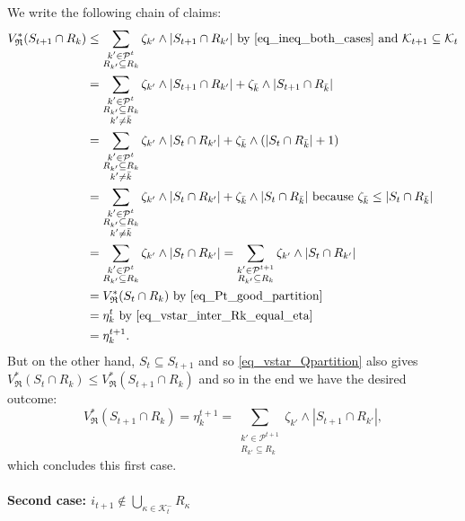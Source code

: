 \documentclass[
  11pt,
  a4paper,
]{article}
\let\oldparagraph\paragraph
\renewcommand{\paragraph}[1]{\oldparagraph{#1}\mbox{}}
\theoremstyle{plain}
\theoremstyle{definition}
\theoremstyle{plain}
\theoremstyle{definition}
\theoremstyle{plain}
\theoremstyle{remark}
\begin{document}
We write the following chain of claims: \begin{align*}
V^*_{\mathfrak{R}}(S_{t+1}\cap R_k)&\leq \sum_{\substack{k'\in\mathcal{P}^{t}\\R_{k'}\subseteq R_k}} \zeta_{k'}\wedge |S_{t+1}\cap R_{k'}|\text{ by~\eqref{eq_ineq_both_cases} and }\mathcal{K}_{t+1}\subseteq\mathcal{K}_t\\
&=\sum_{\substack{k'\in\mathcal{P}^{t}\\R_{k'}\subseteq R_k\\ k'\neq\bar k}} \zeta_{k'}\wedge |S_{t+1}\cap R_{k'}| + \zeta_{\bar k}\wedge |S_{t+1}\cap R_{\bar k}| \\
&=\sum_{\substack{k'\in\mathcal{P}^{t}\\R_{k'}\subseteq R_k\\ k'\neq\bar k}} \zeta_{k'}\wedge |S_{t}\cap R_{k'}| + \zeta_{\bar k}\wedge( |S_{t}\cap R_{\bar k}| +1)\\
&=\sum_{\substack{k'\in\mathcal{P}^{t}\\R_{k'}\subseteq R_k\\ k'\neq\bar k}} \zeta_{k'}\wedge |S_{t}\cap R_{k'}| + \zeta_{\bar k}\wedge|S_{t}\cap R_{\bar k}|\text{ because $\zeta_{\bar k}\leq |S_t\cap R_{\bar k}|$}\\
&=\sum_{\substack{k'\in\mathcal{P}^{t}\\R_{k'}\subseteq R_k}} \zeta_{k'}\wedge |S_{t}\cap R_{k'}|=\sum_{\substack{k'\in\mathcal{P}^{t+1}\\R_{k'}\subseteq R_k}} \zeta_{k'}\wedge |S_{t}\cap R_{k'}| \\
&=V^*_{\mathfrak{R}}(S_t\cap R_k)  \text{ by~\eqref{eq_Pt_good_partition}} \\
&= \eta_k^t  \text{ by~\eqref{eq_vstar_inter_Rk_equal_eta}} \\
&= \eta_k^{t+1}.\\
\end{align*} But on the other hand, \(S_t\subseteq S_{t+1}\) and so
\eqref{eq_vstar_Qpartition} also gives
\(V^*_{\mathfrak{R}}(S_t\cap R_k) \leq V^*_{\mathfrak{R}}(S_{t+1}\cap R_k)\)
and so in the end we have the desired outcome: \begin{equation*}
V^*_{\mathfrak{R}}(S_{t+1}\cap R_k) =  \eta_k^{t+1} =  \sum_{\substack{k'\in\mathcal{P}^{t+1}\\R_{k'}\subseteq R_k}} \zeta_{k'}\wedge |S_{t+1}\cap R_{k'}| ,
\end{equation*} which concludes this first case.

\paragraph{\texorpdfstring{Second case:
\(i_{t+1}\not\in\bigcup_{\kappa\in\mathcal{K}^-_{t}}R_{\kappa}\)}{Second case: i\_\{t+1\}\textbackslash not\textbackslash in\textbackslash bigcup\_\{\textbackslash kappa\textbackslash in\textbackslash mathcal\{K\}\^{}-\_\{t\}\}R\_\{\textbackslash kappa\}}}\label{second-case-i_t1notinbigcup_kappainmathcalk-_tr_kappa}
\end{document}
